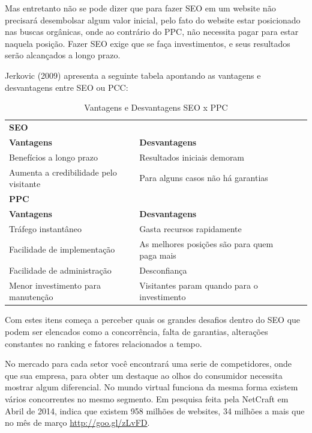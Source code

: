 \documentclass[
	12pt,				%
	openright,			%
	twoside,			%
	a4paper,			%
	english,			%
	french,				%
	spanish,			%
	brazil				%
	]{abntex2}
\begin{document}
Mas entretanto não se pode dizer que para fazer SEO em um website não precisará desembolsar algum valor inicial, pelo fato do website estar posicionado nas buscas orgânicas, onde ao contrário do PPC, não necessita pagar para estar naquela posição. Fazer SEO exige que se faça investimentos, e seus resultados serão alcançados a longo prazo.

Jerkovic (2009) apresenta a seguinte tabela apontando as vantagens e desvantagens entre SEO ou PCC:


\begin{table}[htb]
\ABNTEXfontereduzida
\caption[Vantagens e Desvantagens SEO x PPC]{Vantagens e Desvantagens SEO x PPC}
\label{tab-nivinv}
\begin{center}
\begin{tabular}{p{2.6cm}|p{6.0cm}|p{2.25cm}|p{3.40cm}}
   \textbf{SEO} \\
   \textbf{Vantagens} & \textbf{Desvantagens} \\
    \hline
    Benefícios a longo prazo & Resultados iniciais demoram \\
    \hline
    Aumenta a credibilidade pelo visitante & Para alguns casos não há garantias \\
   \textbf{PPC} \\
   \textbf{Vantagens} & \textbf{Desvantagens} \\
    \hline
    Tráfego instantâneo & Gasta recursos rapidamente \\
    \hline
    Facilidade de implementação & As melhores posições são para quem paga mais \\
    \hline
    Facilidade de administração & Desconfiança \\
    \hline
    Menor investimento para manutenção & Visitantes param quando para o investimento \\
\end{tabular}
\end{center}
\end{table}

Com estes itens começa a perceber quais os grandes desafios dentro do SEO que podem ser elencados como a concorrência, falta de garantias, alterações constantes no ranking e fatores relacionados a tempo.

No mercado para cada setor você encontrará uma serie de competidores, onde que sua empresa, para obter um destaque ao olhos do consumidor necessita mostrar algum diferencial. No mundo virtual funciona da mesma forma existem vários concorrentes no mesmo segmento. Em pesquisa feita pela NetCraft em Abril de 2014, indica que existem 958 milhões de websites, 34 milhões a mais que no mês de março \url{http://goo.gl/zLvFD}.
\end{document}
